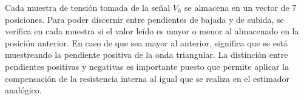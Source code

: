 %
%
%
%

Cada muestra de tensión tomada de la señal $V_h$ se almacena en un vector de 7 posiciones. Para poder discernir entre pendientes de bajada y de subida, se verifica en cada muestra si el valor leído es mayor o menor al almacenado en la posición anterior. En caso de que sea mayor al anterior, significa que se está muestreando la pendiente positiva de la onda triangular. La distinción entre pendientes positivas y negativas es importante puesto que permite aplicar la compensación de la resistencia interna al igual que se realiza en el estimador analógico. 

